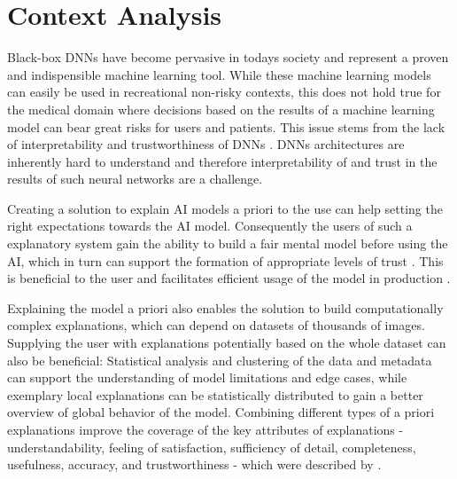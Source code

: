 \documentclass[11pt,a4paper,english]{scrreprt}
\begin{document}
\section{Context Analysis}
Black-box DNNs have become pervasive in todays society and represent a proven and indispensible machine learning tool. While these machine learning models can easily be used in recreational non-risky contexts, this does not hold true for the medical domain where decisions based on the results of a machine learning model can bear great risks for users and patients. This issue stems from the lack of interpretability and trustworthiness of DNNs \parencite{adadi_blackbox_2018}. DNNs architectures are inherently hard to understand and therefore interpretability of and trust in the results of such neural networks are a challenge.

Creating a solution to explain AI models a priori to the use can help setting the right expectations towards the AI model. Consequently the users of such a explanatory system gain the ability to build a fair mental model before using the AI, which in turn can support the formation of appropriate levels of trust \parencite{hoffman_metrics_2019}. This is beneficial to the user and facilitates efficient usage of the model in production \parencite{hoffman_metrics_2019, people_ai_google_website}.

Explaining the model a priori also enables the solution to build computationally complex explanations, which can depend on datasets of thousands of images. Supplying the user with explanations potentially based on the whole dataset can also be beneficial: Statistical analysis and clustering of the data and metadata can support the understanding of model limitations and edge cases, while exemplary local explanations can be statistically distributed to gain a better overview of global behavior of the model. Combining different types of a priori explanations improve the coverage of the key attributes of explanations - understandability, feeling of satisfaction, sufficiency of detail, completeness, usefulness, accuracy, and trustworthiness - which were described by \textcite{hoffman_metrics_2019}.
\end{document}
